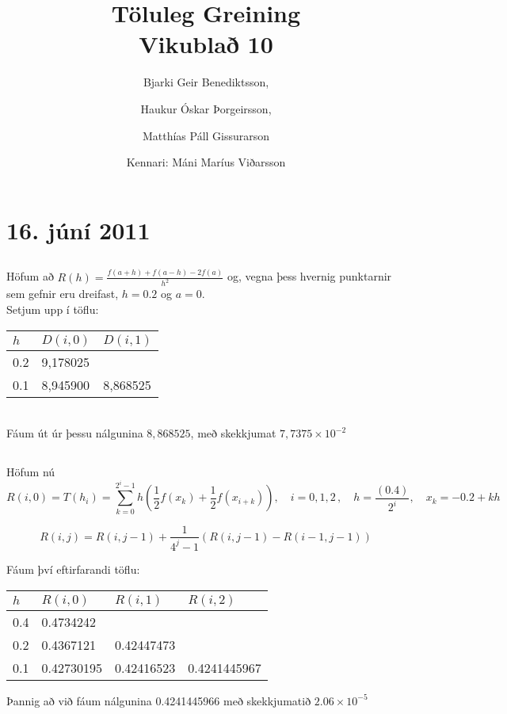\documentclass[10pt,a4paper]{article}
\begin{document}
\title{Töluleg Greining\\Vikublað 10}
\author{ 
  Bjarki Geir Benediktsson,\and
  Haukur Óskar Þorgeirsson,\and
  Matthías Páll Gissurarson \and
  Kennari: Máni Maríus Viðarsson
  }
\maketitle

\setcounter{section}{8}

\section{16. júní 2011}

\subsection{}

Höfum að $R(h) = \frac{f(a+h) + f(a-h) - 2f(a)}{h^2}$ og, vegna þess hvernig punktarnir sem gefnir eru dreifast, $h=0.2$ og $a=0$.\\

Setjum upp í töflu:

\begin{tabular}{l|ll}
$h$&$D(i,0)$&$D(i,1)$\\ \hline
0.2&9,178025\\
0.1&8,945900&8,868525\\
\end{tabular}\\

Fáum út úr þessu nálgunina $8,868525$, með skekkjumat $7,7375 \times 10^{-2}$

\subsection{}

Höfum nú 
\[R(i,0)=T(h_i)=\sum_{k=0}^{2^i-1}h(\frac{1}{2}f(x_k) + \frac{1}{2}f(x_{i+k})),\quad i=0,1,2\, , \quad h=\frac{(0.4)}{2^i},\quad x_k =  -0.2 + kh\]

\[
R(i,j)=R(i,j-1) + \frac{1}{4^j-1}(R(i,j-1)-R(i-1,j-1))
\]

Fáum því eftirfarandi töflu:

\begin{tabular}{l|lll}
$h$&$R(i,0)$&$R(i,1)$&$R(i,2)$\\ \hline
0.4&0.4734242\\
0.2&0.4367121&0.42447473\\
0.1&0.42730195&0.42416523&0.4241445967\\
\end{tabular}

Þannig að við fáum nálgunina 0.4241445966 með skekkjumatið $2.06 \times 10^{-5}$

\section{}
\end{document}
